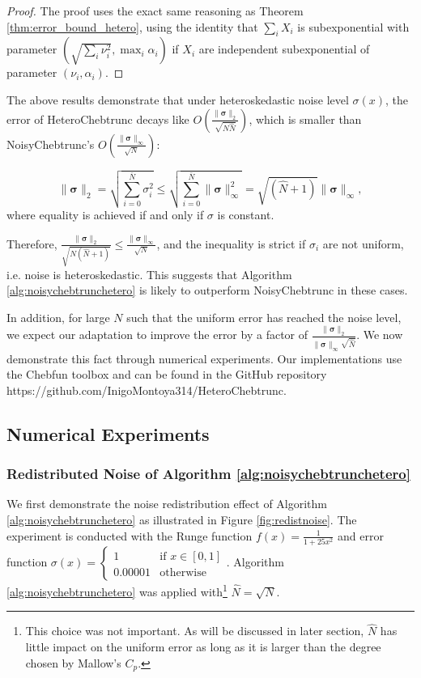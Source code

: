 \documentclass[pdflatex,sn-mathphys-num]{sn-jnl}%
\theoremstyle{thmstyleone}%
\theoremstyle{thmstyletwo}%
\theoremstyle{thmstylethree}%
\begin{document}
\begin{proof}
	The proof uses the exact same reasoning as Theorem \ref{thm:error_bound_hetero}, using the identity that $\sum_i X_i$ is subexponential with parameter $(\sqrt{\sum_i \nu_i^2}, \max_i\alpha_i)$ if $X_i$ are independent subexponential of parameter $(\nu_i,\alpha_i)$.
\end{proof}

The above results demonstrate that under heteroskedastic noise level $\sigma(x)$, the error of HeteroChebtrunc decays like $O(\frac{\|\bm{\sigma}\|_2}{\sqrt{N\hat{N}}})$, which is smaller than NoisyChebtrunc's $O(\frac{\|\bm{\sigma}\|_\infty}{\sqrt{N}})$:

\[\|\bm{\sigma}\|_2 = \sqrt{\sum_{i=0}^{\bar{N}} \sigma_i^2} \leq \sqrt{\sum_{i=0}^{\bar{N}} \|\bm{\sigma}\|_\infty^2} =  \sqrt{(\hat{N}+1)}\|\bm{\sigma}\|_\infty,\]
where equality is achieved if and only if $\sigma$ is constant.

Therefore, $\frac{\|\bm{\sigma}\|_2}{\sqrt{N(\hat{N}+1)}} \leq \frac{\|\bm{\sigma}\|_\infty}{\sqrt{N}}$, and the inequality is strict if $\sigma_i$ are not uniform, i.e. noise is heteroskedastic. This suggests that Algorithm \ref{alg:noisychebtrunchetero} is likely to outperform NoisyChebtrunc in these cases. 

In addition, for large $N$ such that the uniform error has reached the noise level, we expect our adaptation to improve the error by a factor of $\frac{\|\bm{\sigma}\|_2}{\|\bm{\sigma}\|_\infty\sqrt{\hat{N}}}$. We now demonstrate this fact through numerical experiments. Our implementations use the Chebfun toolbox \cite{chebfun} and can be found in the GitHub repository https://github.com/InigoMontoya314/HeteroChebtrunc.


\subsection{Numerical Experiments}\label{sec:num-hetero}


\subsubsection{Redistributed Noise of Algorithm \ref{alg:noisychebtrunchetero}}

We first demonstrate the noise redistribution effect of Algorithm \ref{alg:noisychebtrunchetero} as illustrated in Figure \ref{fig:redistnoise}. The experiment is conducted with the Runge function $f(x) = \frac{1}{1+25x^2}$ and error function $\sigma(x) = \begin{cases}
	1 & \text{if } x \in [0,1]\\
	0.00001 & \text{otherwise} 
\end{cases}$. Algorithm \ref{alg:noisychebtrunchetero} was applied with\footnote{This choice was not important. As will be discussed in later section, $\hat{N}$ has little impact on the uniform error as long as it is larger than the degree chosen by Mallow's $C_p$.} $\hat{N} = \sqrt{N}$. 
\end{document}
